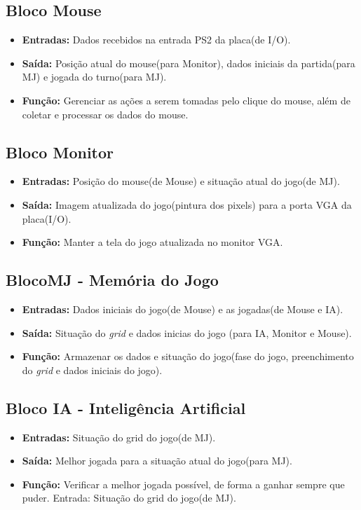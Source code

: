 \documentclass{article}
\begin{document}
    \subsection{Bloco Mouse}
        \begin{itemize}
            \item \textbf{Entradas:} Dados recebidos na entrada PS2 da placa(de I/O).
            \item \textbf{Saída:} Posição atual do mouse(para Monitor), dados iniciais da partida(para MJ) e jogada do turno(para MJ).
            \item \textbf{Função:} Gerenciar as ações a serem tomadas pelo clique do mouse, além de coletar e processar os dados do mouse.
        \end{itemize}

    \subsection{Bloco Monitor}
        \begin{itemize}
            \item \textbf{Entradas:} Posição do mouse(de Mouse) e situação atual do jogo(de MJ).
            \item \textbf{Saída:} Imagem atualizada do jogo(pintura dos pixels) para a porta VGA da placa(I/O).
            \item \textbf{Função:} Manter a tela do jogo atualizada no monitor VGA.
        \end{itemize}

    \subsection{BlocoMJ - Memória do Jogo}
        \begin{itemize}
            \item \textbf{Entradas:} Dados iniciais do jogo(de Mouse) e as jogadas(de Mouse e IA).
            \item \textbf{Saída:} Situação do \emph{grid} e dados inicias do jogo (para IA, Monitor e Mouse).
            \item \textbf{Função:} Armazenar os dados e situação do jogo(fase do jogo, preenchimento do \emph{grid} e dados iniciais do jogo).
        \end{itemize}

    \subsection{Bloco IA - Inteligência Artificial}
        \begin{itemize}
            \item \textbf{Entradas:} Situação do grid do jogo(de MJ).
            \item \textbf{Saída:} Melhor jogada para a situação atual do jogo(para MJ).
            \item \textbf{Função:} Verificar a melhor jogada possível, de forma a ganhar sempre que puder.
Entrada: Situação do grid do jogo(de MJ).
        \end{itemize}
\end{document}

